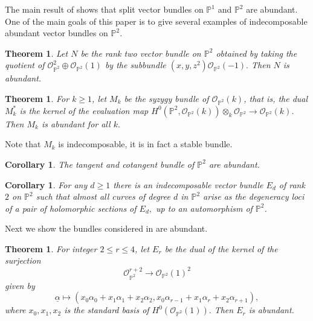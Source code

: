 \documentclass[11pt]{amsart}
\newtheorem{thm}[subsection]{Theorem}
\newtheorem{corol}[subsection]{Corollary}
\theoremstyle{definition}
\begin{document}
The main result of \cite{LuJu} shows that split vector bundles on $\mathbb{P}^1$ and 
$\mathbb{P}^2$ are abundant. One of the main goals of this paper is to give several 
examples of indecomposable abundant vector bundles on $\mathbb{P}^2$.
\begin{thm}\label{thm1}
Let $N$ be the rank two vector bundle on $\mathbb{P}^2$ obtained by taking the 
quotient of ${\mathcal O}_{\mathbb{P}^2}^2 \oplus {\mathcal O}_{\mathbb{P}^2}(1) $
 by the subbundle $(x,y,z^2){\mathcal O}_{\mathbb{P}^2}(-1).$ Then $N$ is abundant.
\end{thm}
\begin{thm}\label{thm2}
For $k\geq 1$, let $M_k$ be the syzygy bundle of $\mathcal{O}_{\mathbb{P}^2}(k)$,
that is, the dual $M_k^*$ is the kernel of the evaluation map 
$H^0(\mathbb{P}^2,\mathcal{O}_{\mathbb{P}^2}(k))\otimes_k \mathcal{O}_{\mathbb{P}^2}
\to \mathcal{O}_{\mathbb{P}^2}(k)$. Then $M_k$ is abundant for all $k.$
\end{thm}

Note that $M_k$ is indecomposable, it is in fact a stable bundle.
\begin{corol}\label{tgt}
    The tangent and cotangent bundle of $\mathbb{P}^2$ are abundant.
\end{corol}


\begin{corol}\label{cor1}
For any $d\geq 1$ there is an indecomposable vector bundle $E_d$ of rank
$2$ on $\mathbb{P}^2$ such that  almost all curves of degree $d$ in 
$\mathbb{P}^2$ arise as the degeneracy loci of a pair of holomorphic 
sections of  $E_d,$ up to an automorphism of $\mathbb{P}^2$.
\end{corol}
Next we show the bundles considered in \cite{ray2020projective} are abundant.
\begin{thm}\label{thm3}
For integer $2\leq r\leq 4$, let $E_r$ be the dual of the kernel of the surjection \begin{equation*}
\mathcal{O}_{\mathbb{P}^2}^{r+2}\to\mathcal{O}_{\mathbb{P}^2}(1)^{2}     
\end{equation*}
given by 
\begin{equation*}
 \underline{\alpha}\longmapsto (x_{0}\alpha_{0}+x_{1}\alpha_{1}+x_{2}\alpha_{2}, x_{0}\alpha_{r-1}+x_{1}\alpha_{r}+x_{2}\alpha_{r+1}),   
\end{equation*} where $x_0,x_1,x_2$ is the standard basis of 
$H^0(\mathcal{O}_{\mathbb{P}^2}(1)).$ Then $E_r$ is abundant.
\end{thm}
\end{document}
